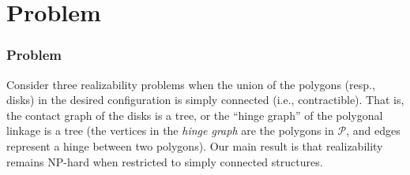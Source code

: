 \documentclass{beamer}
\newtheorem{thm}{Theorem}
\renewcommand{\PP}{{\mathcal{P}}} %
\begin{document}
\section{Problem}
   \begin{frame}
    \frametitle{Problem}
Consider three realizability problems when the union of the polygons 
(resp., disks) in the desired configuration is simply connected (i.e., contractible). That is, the 
contact graph of the disks is a tree, or the ``hinge graph'' of the polygonal linkage is a tree (the 
vertices in the \emph{hinge graph} are the polygons in $\PP$, and edges represent a hinge between 
two polygons). Our main result is that realizability remains NP-hard when restricted to simply 
connected structures.
    \end{frame}
\end{document}
